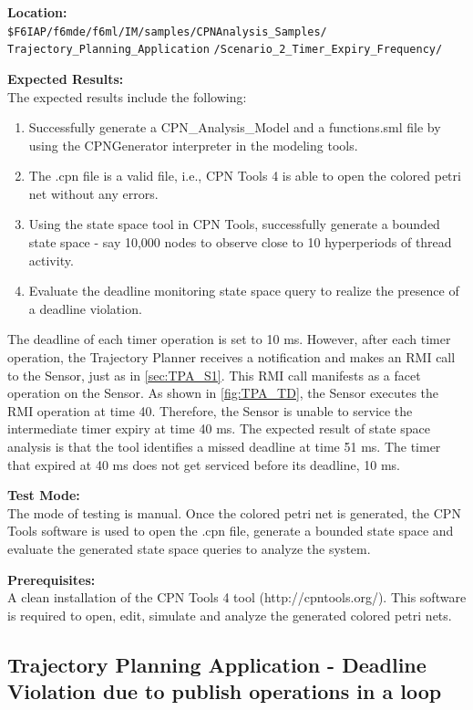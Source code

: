 \noindent\textbf{Location:}\\
\texttt{\$F6IAP/f6mde/f6ml/IM/samples/CPNAnalysis\_Samples/ \\ Trajectory\_Planning\_Application}
\texttt{/Scenario\_2\_Timer\_Expiry\_Frequency/}

\noindent\textbf{Expected Results:}\\

The expected results include the following: 
\begin{enumerate}
\item Successfully generate a CPN\_Analysis\_Model and a functions.sml file by using the CPNGenerator interpreter in the modeling tools.
\item The .cpn file is a valid file, i.e., CPN Tools 4 is able to open the colored petri net without any errors.
\item Using the state space tool in CPN Tools, successfully generate a bounded state space - say 10,000 nodes to observe close to 10 hyperperiods of thread activity.
\item Evaluate the deadline monitoring state space query to realize the presence of a deadline violation.
\end{enumerate}

The deadline of each timer operation is set to 10 ms. However, after each timer operation, the Trajectory Planner receives a notification and makes an RMI call to the Sensor, just as in \ref{sec:TPA_S1}. This RMI call manifests as a facet operation on the Sensor. As shown in \ref{fig:TPA_TD}, the Sensor executes the RMI operation at time 40. Therefore, the Sensor is unable to service the intermediate timer expiry at time 40 ms. The expected result of state space analysis is that the tool identifies a missed deadline at time 51 ms. The timer that expired at 40 ms does not get serviced before its deadline, 10 ms. 

\noindent\textbf{Test Mode:}\\
The mode of testing is manual. Once the colored petri net is generated, the CPN Tools software is used to open the .cpn file, generate a bounded state space and evaluate the generated state space queries to analyze the system.

\noindent\textbf{Prerequisites:}\\
A clean installation of the CPN Tools 4 tool (http://cpntools.org/). This software is required to open, edit, simulate and analyze the generated colored petri nets. 

\subsection{Trajectory Planning Application - Deadline Violation due to publish operations in a loop}


